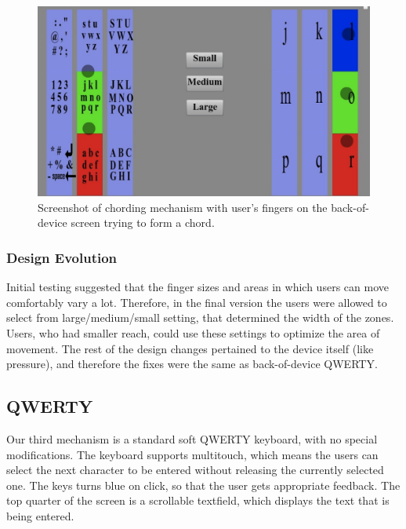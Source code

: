 \begin{figure}
    \includegraphics[scale=0.45]{Figures/chording.pdf} 
    \caption{Screenshot of chording mechanism with user's fingers on
      the back-of-device screen trying to form a chord.}
       \label{fig:chording_example}
\end{figure} 
\subsubsection{Design Evolution}

Initial testing suggested that the finger sizes and areas in which users can move comfortably vary a lot. Therefore, in the final version the users were allowed to select from large/medium/small setting, that determined the width of the zones. Users, who had smaller reach, could use these settings to optimize the area of movement. The rest of the design changes pertained to the device itself (like pressure), and therefore the fixes were the same as back-of-device QWERTY.

\subsection{QWERTY}

Our third mechanism is a standard soft QWERTY keyboard, with no special modifications. The keyboard supports multitouch, which means the users can select the next character to be entered without releasing the currently selected one. The keys turns blue on click, so that the user gets appropriate feedback. The top quarter of the screen is a scrollable textfield, which displays the text that is being entered.
